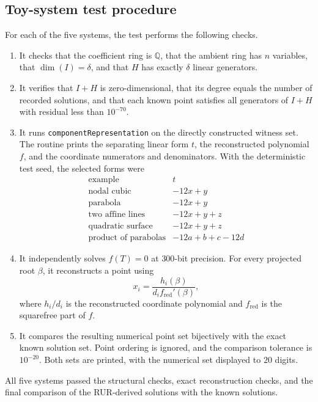 \documentclass{weeklyprogress}
\begin{document}
\subsection{Toy-system test procedure}

For each of the five systems, the test performs the following checks.

\begin{enumerate}
  \item It checks that the coefficient ring is $\mathbb{Q}$, that the ambient
  ring has $n$ variables, that $\dim(I)=\delta$, and that $H$ has exactly
  $\delta$ linear generators.
  \item It verifies that $I+H$ is zero-dimensional, that its degree equals the
  number of recorded solutions, and that each known point satisfies all
  generators of $I+H$ with residual less than $10^{-70}$.
  \item It runs \verb|componentRepresentation| on the directly constructed
  witness set.  The routine prints the separating linear form $t$, the
  reconstructed polynomial $f$, and the coordinate numerators and
  denominators.  With the deterministic test seed, the selected forms were
  \[
  \begin{array}{c|c}
  \text{example} & t \\
  \hline
  \text{nodal cubic} & -12x+y \\
  \text{parabola} & -12x+y \\
  \text{two affine lines} & -12x+y+z \\
  \text{quadratic surface} & -12x+y+z \\
  \text{product of parabolas} & -12a+b+c-12d
  \end{array}
  \]
  \item It independently solves $f(T)=0$ at $300$-bit precision.  For every
  projected root $\beta$, it reconstructs a point using
  \[
  x_i=\frac{h_i(\beta)}{d_i f_{\mathrm{red}}'(\beta)},
  \]
  where $h_i/d_i$ is the reconstructed coordinate polynomial and
  $f_{\mathrm{red}}$ is the squarefree part of $f$.
  \item It compares the resulting numerical point set bijectively with the
  exact known solution set.  Point ordering is ignored, and the comparison
  tolerance is $10^{-20}$.  Both sets are printed, with the numerical set
  displayed to $20$ digits.
\end{enumerate}

All five systems passed the structural checks, exact reconstruction checks,
and the final comparison of the RUR-derived solutions with the known
solutions.
\end{document}
